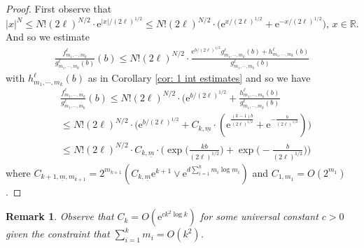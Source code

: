 \documentclass[11pt, reqno]{amsart}
\numberwithin{equation}{section}
\newtheorem*{remark}{Remark}
\newcommand{\R}{\ensuremath{\mathbb{R}}}
\begin{document}
\begin{proof}
First observe that
\begin{equation*}
    |x|^N \le N!(2\ell)^{N/2} \cdot \mathrm{e}^{|x|/(2\ell)^{1/2}}\le N!(2\ell)^{N/2} \cdot \big(\mathrm{e}^{x/(2\ell)^{1/2}}+\mathrm{e}^{-x/(2\ell)^{1/2}}\big),\, x\in \R.
\end{equation*}
And so we estimate
    \begin{equation*}
        \begin{array}{cc}
            \displaystyle\frac{f^\ell_{m_1, \cdots, m_k}}{g^\ell_{m_1, \cdots, m_k}(b)}(b) \le N!(2\ell)^{N/2} \cdot \displaystyle\frac{\mathrm{e}^{b/(2\ell)^{1/2}}g^\ell_{m_1, \cdots, m_k}(b) + h^\ell_{m_1, \cdots, m_k}(b)}{g^\ell_{m_1, \cdots, m_k}(b)}
        \end{array}
    \end{equation*}
    with $ h^\ell_{m_1, \cdots, m_k}(b)$ as in Corollary \ref{cor: 1 int estimates} and so we have
    \begin{equation*}
        \begin{array}{cc}
            &\displaystyle\frac{f^\ell_{m_1, \cdots, m_k}}{g^\ell_{m_1, \cdots, m_k}}(b) \le N!(2\ell)^{N/2} \cdot \big( \mathrm{e}^{b/(2\ell)^{1/2}} + \frac{h^\ell_{m_1, \cdots, m_k}(b)}{g^\ell_{m_1, \cdots, m_k}(b)}\\
            & \le  N!(2\ell)^{N/2} \cdot \big(\mathrm{e}^{b/(2\ell)^{1/2}} + C_{k,\underline{m}} \cdot (\mathrm{e}^{\frac{(k-1)b}{(2\ell)^{1/2}}}+\mathrm{e}^{-\frac{b}{(2\ell)^{1/2}}})\big)\\
            & \le N!(2\ell)^{N/2} \cdot C_{k,\underline{m}} \cdot \big( \exp\big(\frac{kb}{(2\ell)^{1/2}}\big)+\exp\big(-\frac{b}{(2\ell)^{1/2}}\big)\big)
        \end{array}
    \end{equation*}
    where $C_{k+1, \underline{m},m_{k+1}} = 2^{m_{k+1}}(C_{k,\underline{m}}\mathrm{e}^{k+1}\lor \mathrm{e}^{d\sum_{i=1}^k m_i\log m_i})$ and $C_{1, m_1} = O(2^{m_1})$.
\end{proof}
\begin{remark}
    Observe that $C_k = O(\mathrm{e}^{ck^2\log k})$ for some universal constant $c>0$ given the constraint that $\sum_{i=1}^k m_i= O(k^2)$.
\end{remark}
\end{document}
